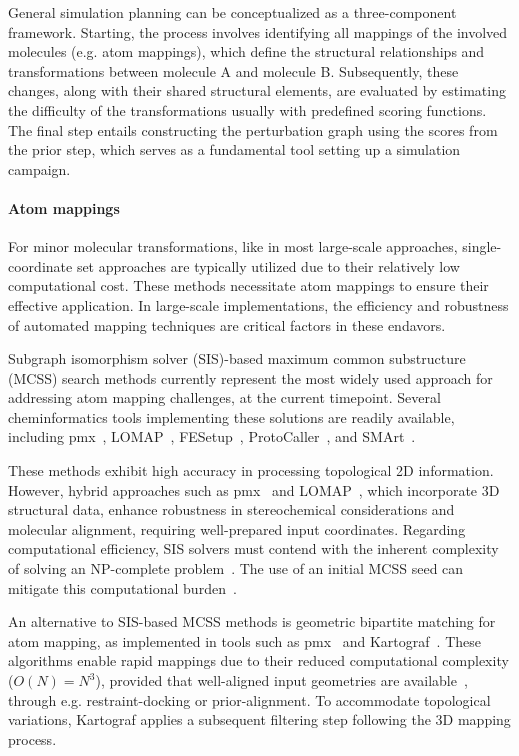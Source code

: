 \documentclass[9pt,bestpractices,pubversion]{livecoms}
\begin{document}
General simulation planning can be conceptualized as a three-component framework. Starting, the process involves identifying all mappings of the involved molecules (e.g. atom mappings), which define the structural relationships and transformations between molecule A and molecule B. Subsequently, these changes, along with their shared structural elements, are evaluated by estimating the difficulty of the transformations usually with predefined scoring functions. The final step entails constructing the perturbation graph using the scores from the prior step, which serves as a fundamental tool setting up a simulation campaign.

\paragraph{Atom mappings}
For minor molecular transformations, like in most large-scale approaches, single-coordinate set approaches are typically utilized due to their relatively low computational cost. These methods necessitate atom mappings to ensure their effective application. In large-scale implementations, the efficiency and robustness of automated mapping techniques are critical factors in these endavors.

Subgraph isomorphism solver (SIS)-based maximum common substructure (MCSS) search methods currently represent the most widely used approach for addressing atom mapping challenges, at the current timepoint. Several cheminformatics tools implementing these solutions are readily available, including pmx~\cite{gapsys2015pmx}, LOMAP~\cite{liu2013lead}, FESetup~\cite{loeffler2015fesetup}, ProtoCaller~\cite{suruzhon2020protocaller}, and SMArt~\cite{petrov2021perturbation}.

These methods exhibit high accuracy in processing topological 2D information. However, hybrid approaches such as pmx~\cite{gapsys2015pmx} and LOMAP~\cite{liu2013lead}, which incorporate 3D structural data, enhance robustness in stereochemical considerations and molecular alignment, requiring well-prepared input coordinates. Regarding computational efficiency, SIS solvers must contend with the inherent complexity of solving an NP-complete problem~\cite{raymond2002maximum, Duesbury2018Comparison}. The use of an initial MCSS seed can mitigate this computational burden~\cite{raymond2002maximum}.

An alternative to SIS-based MCSS methods is geometric bipartite matching for atom mapping, as implemented in tools such as pmx~\cite{gapsys2015pmx} and Kartograf~\cite{ries2024kartograf}. These algorithms enable rapid mappings due to their reduced computational complexity ($O(N) = N^3$), provided that well-aligned input geometries are available~\cite{ries2024kartograf}, through e.g. restraint-docking or prior-alignment. To accommodate topological variations, Kartograf applies a subsequent filtering step following the 3D mapping process.
\end{document}
